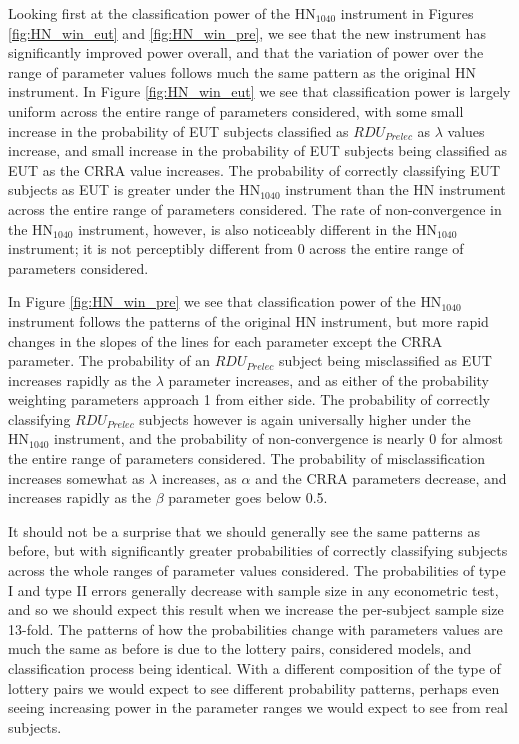 \documentclass[../main.tex]{subfiles}
\begin{document}
Looking first at the classification power of the $\text{HN}_{1040}$ instrument in Figures \ref{fig:HN_win_eut} and \ref{fig:HN_win_pre}, we see that the new instrument has significantly improved power overall, and that the variation of power over the range of parameter values follows much the same pattern as the original HN instrument.
In Figure \ref{fig:HN_win_eut} we see that classification power is largely uniform across the entire range of parameters considered, with some small increase in the probability of EUT subjects classified as $\mathit{RDU_{Prelec}}$ as $\lambda$ values increase, and small increase in the probability of EUT subjects being classified as EUT as the CRRA value increases.
The probability of correctly classifying EUT subjects as EUT is greater under the $\text{HN}_{1040}$ instrument than the HN instrument across the entire range of parameters considered.
The rate of non-convergence in the $\text{HN}_{1040}$ instrument, however, is also noticeably different in the $\text{HN}_{1040}$ instrument; it is not perceptibly different from 0 across the entire range of parameters considered.

In Figure \ref{fig:HN_win_pre} we see that classification power of the $\text{HN}_{1040}$ instrument follows the patterns of the original HN instrument, but more rapid changes in the slopes of the lines for each parameter except the CRRA parameter.
The probability of an $\mathit{RDU_{Prelec}}$ subject being misclassified as EUT increases rapidly as the $\lambda$ parameter increases, and as either of the probability weighting parameters approach 1 from either side.
The probability of correctly classifying $\mathit{RDU_{Prelec}}$ subjects however is again universally higher under the $\text{HN}_{1040}$ instrument, and the probability of non-convergence is nearly 0 for almost the entire range of parameters considered.
The probability of misclassification increases somewhat as $\lambda$ increases, as $\alpha$ and the CRRA parameters decrease, and increases rapidly as the $\beta$ parameter goes below 0.5.

It should not be a surprise that we should generally see the same patterns as before, but with significantly greater probabilities of correctly classifying subjects across the whole ranges of parameter values considered.
The probabilities of type I and type II errors generally decrease with sample size in any econometric test, and so we should expect this result when we increase the per-subject sample size 13-fold.
The patterns of how the probabilities change with parameters values are much the same as before is due to the lottery pairs, considered models, and classification process being identical.
With a different composition of the type of lottery pairs we would expect to see different probability patterns, perhaps even seeing increasing power in the parameter ranges we would expect to see from real subjects.
\end{document}
